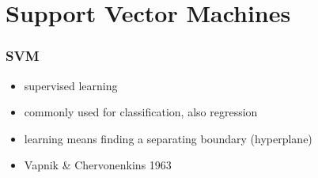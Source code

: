 \documentclass[english,hangout]{beamer}
\begin{document}
\section{Support Vector Machines}
\begin{frame}
	\frametitle{SVM}

  \begin{itemize}
  \item supervised learning
  \item commonly used for classification, also regression
  \item learning means finding a separating boundary (hyperplane)
  \item Vapnik \& Chervonenkins 1963
  \end{itemize}
\end{frame}

	


\end{document}
